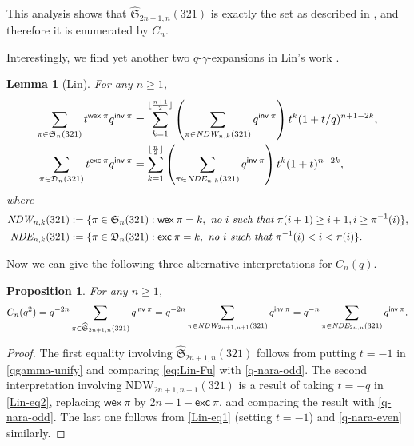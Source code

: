 \documentclass[12pt,reqno]{amsart}
\numberwithin{equation}{section}
\theoremstyle{plain}
\newtheorem{lemma}[theorem]{Lemma}
\newtheorem{proposition}[theorem]{Proposition}
\theoremstyle{definition}
\def\S{\mathfrak{S}}
\def\D{\mathfrak{D}}
\def\M{\mathcal{M}}
\def\exc{\mathsf{exc}}
\def\inv{\mathsf{inv}}
\def\fix{\mathsf{fix}}
\def\wex{\mathsf{wex}}
\begin{document}
This analysis shows that $\widehat{\S}_{2n+1,n}(321)$ is exactly the set as described in \cite[Excercise 145]{Sta2}, and therefore it is enumerated by $C_n$.

Interestingly, we find yet another two $q$-$\gamma$-expansions in Lin's work \cite[Theorems~1.2 and 1.4]{Lin17}.
\begin{lemma}[Lin]
For any $n\ge 1$,
\begin{align}
\sum_{\pi\in\S_n(321)}t^{\wex\:\pi}q^{\inv\:\pi} &=\sum_{k=1}^{\lfloor\frac{n+1}{2}\rfloor}\left(\sum_{\pi\in\emph{NDW}_{n,k}(321)}q^{\inv\:\pi}\right)t^k(1+t/q)^{n+1-2k},\label{Lin-eq2}\\
\sum_{\pi\in\D_n(321)}t^{\exc\:\pi}q^{\inv\:\pi} &=\sum_{k=1}^{\lfloor\frac{n}{2}\rfloor}\left(\sum_{\pi\in\emph{NDE}_{n,k}(321)}q^{\inv\:\pi}\right)t^k(1+t)^{n-2k},\label{Lin-eq1}
\end{align}
where
\begin{align*}
\emph{NDW}_{n,k}(321) &:=\{\pi\in\S_{n}(321):\wex\:\pi=k,~\emph{no}~i~\emph{such~that}~\pi(i+1)\geq i+1, i\geq\pi^{-1}(i)\},\\
\emph{NDE}_{n,k}(321) &:=\{\pi\in\D_{n}(321):\exc\:\pi=k,~\emph{no $i$ such that $\pi^{-1}(i)<i<\pi(i)$}\}.
\end{align*}
\end{lemma}

Now we can give the following three alternative interpretations for $C_n(q)$.
\begin{proposition}\label{cnq: three sets}
For any $n\geq1$,
\begin{align*}
C_n(q^2)=q^{-2n}\sum_{\pi\in\widehat{\S}_{2n+1,n}(321)}q^{\inv\:\pi} =q^{-2n}\sum_{\pi\in\emph{NDW}_{2n+1,n+1}(321)}q^{\inv\:\pi}=q^{-n}\sum_{\pi\in\emph{NDE}_{2n,n}(321)}q^{\inv\:\pi}.
\end{align*}
\end{proposition}
\begin{proof}
The first equality involving $\widehat{\S}_{2n+1,n}(321)$ follows from putting $t=-1$ in \eqref{qgamma-unify} and comparing \eqref{eq:Lin-Fu} with \eqref{q-nara-odd}. The second interpretation involving $\text{NDW}_{2n+1,n+1}(321)$ is a result of taking $t=-q$ in \eqref{Lin-eq2}, replacing $\wex\:\pi$ by $2n+1-\exc\:\pi$, and comparing the result with \eqref{q-nara-odd}. The last one follows from \eqref{Lin-eq1} (setting $t=-1$) and \eqref{q-nara-even} similarly.
\end{proof}
\end{document}
